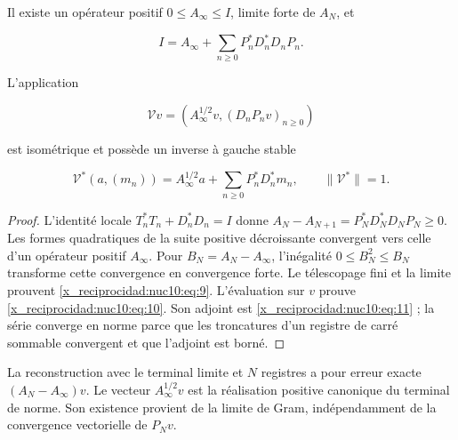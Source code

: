 \begin{theorem}
\label{x_reciprocidad:nuclear:terminal-no-estacionario}
Il existe un opérateur positif \(0\leq A_\infty\leq I\), limite forte de \(A_N\), et



\begin{equation}
\boxed{I=A_\infty+\sum_{n\ge0}P_n^*D_n^*D_nP_n.}
\label{x_reciprocidad:nuc10:eq:9}
\end{equation}



L'application



\begin{equation}
\boxed{\mathcal Vv=(A_\infty^{1/2}v,(D_nP_nv)_{n\ge0})}
\label{x_reciprocidad:nuc10:eq:10}
\end{equation}



est isométrique et possède un inverse à gauche stable



\begin{equation}
\mathcal V^*(a,(m_n))=A_\infty^{1/2}a+
\sum_{n\ge0}P_n^*D_n^*m_n,\qquad\|\mathcal V^*\|=1.
\label{x_reciprocidad:nuc10:eq:11}
\end{equation}



\end{theorem}
\begin{proof}
L’identité locale \(T_n^*T_n+D_n^*D_n=I\) donne
\(A_N-A_{N+1}=P_N^*D_N^*D_NP_N\geq0\). Les formes quadratiques de
la suite positive décroissante convergent vers celle d’un opérateur positif
\(A_\infty\). Pour \(B_N=A_N-A_\infty\), l’inégalité
\(0\leq B_N^2\leq B_N\) transforme cette convergence en convergence forte.
Le télescopage fini et la limite prouvent \eqref{x_reciprocidad:nuc10:eq:9}. L’évaluation sur \(v\)
prouve \eqref{x_reciprocidad:nuc10:eq:10}. Son adjoint est \eqref{x_reciprocidad:nuc10:eq:11} ; la série converge en norme parce que
les troncatures d’un registre de carré sommable convergent et que l’adjoint est borné.
\end{proof}

La reconstruction avec le terminal limite et \(N\) registres a pour erreur
exacte \((A_N-A_\infty)v\). Le vecteur \(A_\infty^{1/2}v\) est la
réalisation positive canonique du terminal de norme. Son existence provient
de la limite de Gram, indépendamment de la convergence vectorielle de \(P_Nv\).

